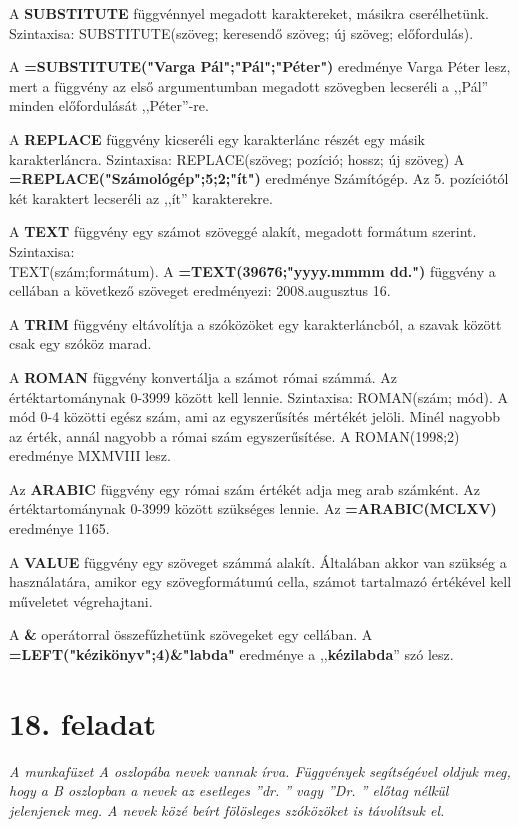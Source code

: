 A \textbf{SUBSTITUTE} függvénnyel megadott karaktereket, másikra
cserélhetünk. Szintaxisa: SUBSTITUTE(szöveg; keresendő
szöveg; új szöveg; előfordulás).

A \textsf{\textbf{=SUBSTITUTE("Varga Pál";"Pál";"Péter")}}
eredménye Varga Péter lesz, mert a függvény az első
argumentumban megadott szövegben lecseréli a
,,Pál'' minden előfordulását ,,Péter''-re.

A \textbf{REPLACE} függvény kicseréli egy karakterlánc
részét egy másik karakterláncra. Szintaxisa: REPLACE(szöveg;
pozíció; hossz; új szöveg) A
\textsf{\textbf{=REPLACE("Számológép";5;2;"ít")}}
eredménye Számítógép. Az 5. pozíciótól két karaktert
lecseréli az ,,ít'' karakterekre.

A \textbf{TEXT} függvény egy számot szöveggé alakít,
megadott formátum szerint. Szintaxisa:\\
TEXT(szám;formátum). A \textsf{\textbf{=TEXT(39676;"yyyy.mmmm dd.")}}
függvény a cellában  a következő szöveget eredményezi: 2008.augusztus 16. 

A \textbf{TRIM} függvény eltávolítja a szóközöket egy
karakterláncból, a szavak között csak egy szóköz marad.

A \textbf{ROMAN} függvény konvertálja a számot római
számmá. Az értéktartománynak 0-3999 között kell lennie.
Szintaxisa: ROMAN(szám; mód). A mód 0-4 közötti egész
szám, ami az egyszerűsítés  mértékét jelöli. Minél
nagyobb az érték, annál nagyobb a római szám
egyszerűsítése. A ROMAN(1998;2) eredménye MXMVIII lesz.

Az \textbf{ARABIC} függvény egy római szám értékét adja
meg arab számként. Az értéktartománynak 0-3999 között
szükséges lennie. Az \textsf{\textbf{=ARABIC(MCLXV)}} eredménye
1165.

A \textbf{VALUE} függvény egy szöveget számmá alakít.
Általában akkor van szükség a használatára, amikor egy
szövegformátumú cella, számot tartalmazó értékével kell
műveletet végrehajtani.  

A \textbf{\&} operátorral összefűzhetünk szövegeket egy
cellában. A
\textsf{\textbf{=LEFT("kézikönyv";4)\&{"labda"}}}
eredménye a ,,\textbf{kézilabda}''
szó lesz. 


\section{18. feladat}
{\itshape
A munkafüzet A oszlopába nevek vannak írva. Függvények
segítségével oldjuk meg, hogy a B oszlopban a nevek az esetleges
''dr. '' vagy ''Dr. '' előtag nélkül
jelenjenek meg. A nevek közé beírt fölösleges
szóközöket is távolítsuk el.}

